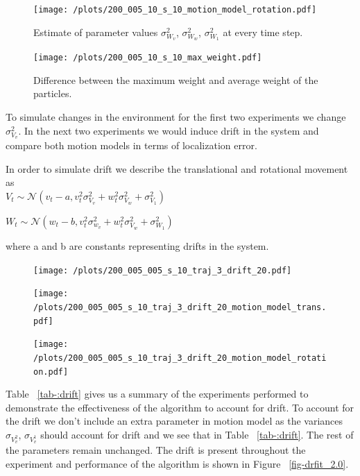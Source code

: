 \documentclass[12pt,draft]{dalcsthesis}
\begin{document}
\begin{figure}
  \centering
     {\texttt{[image: /plots/200\_005\_10\_s\_10\_motion\_model\_rotation.pdf]}}
  \caption{\label{fig-varying_sensor_noise_motion_model_1.0}Estimate of parameter values $\sigma_{W_{v}}^{2}$, $\sigma_{W_{w}}^{2}$, $\sigma_{W_{1}}^{2}$ at every time step. }
\end{figure}

\begin{figure}
  \centering
     {\texttt{[image: /plots/200\_005\_10\_s\_10\_max\_weight.pdf]}}
  \caption{\label{fig-varying_sensor_noise_sensor_model_1.0}  Difference between the maximum weight and average weight of the particles.}
\end{figure}

To simulate changes in the environment for the first two experiments we change $\sigma_{V_{v}}^2$. In the next two experiments we would induce drift in the system and compare both motion models in terms of localization error.

In order to simulate drift we describe the translational and rotational movement as
\\
$V_{t}\sim\mathcal{{N}}(v_{t}-a,v_{t}^{2}\sigma_{V_{v}}^{2}+w_{t}^{2}\sigma_{V_{w}}^{2}+\sigma_{V_{1}}^{2})$

$W_{t}\sim\mathcal{{N}}(w_{t}-b,v_{t}^{2}\sigma_{w_{v}}^{2}+w_{t}^{2}\sigma_{V_{w}}^{2}+\sigma_{W_{1}}^{2})$

where a and b are constants representing drifts in the system. 

\begin{figure}
  \centering
     {\texttt{[image: /plots/200\_005\_005\_s\_10\_traj\_3\_drift\_20.pdf]}}
  \caption{\label{fig-drift_2.0} }
\end{figure}
   
   
\begin{figure}
  \centering
     {\texttt{[image: /plots/200\_005\_005\_s\_10\_traj\_3\_drift\_20\_motion\_model\_trans.pdf]}}
  \caption{\label{fig-drift_motion_model_1.0_trans} }
\end{figure}

\begin{figure}
  \centering
     {\texttt{[image: /plots/200\_005\_005\_s\_10\_traj\_3\_drift\_20\_motion\_model\_rotation.pdf]}}
  \caption{\label{fig-drift_motion_model_1.0_rotation} }
\end{figure}

Table ~\ref{tab-:drift} gives us a summary of the experiments performed to demonstrate the effectiveness of the algorithm to account for drift. To account for the drift we don't include an extra parameter in motion model as the variances $\sigma_{V_{v}^{2}}$, $\sigma_{V_{v}^{1}}$  should account for drift and we see that in Table ~\ref{tab-:drift}. The rest of the parameters remain unchanged. The drift is present throughout the experiment and performance of the algorithm is shown in Figure ~\ref{fig-drfit_2.0}.
\end{document}
